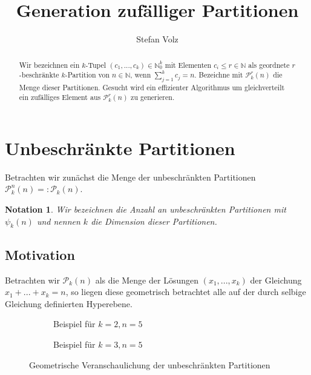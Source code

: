 \documentclass{article}
\title{Generation zufälliger Partitionen}
\author{Stefan Volz}
\newtheorem{notation}{Notation}
\begin{document}
\begin{titlepage}
    \maketitle

    \begin{abstract}
        Wir bezeichnen ein $k$-Tupel $(c_1,...,c_k) \in \mathbb{N}_0^k$ mit Elementen $c_i \leq r \in \mathbb{N}$ als geordnete $r$-beschränkte $k$-Partition von $n \in \mathbb{N}$, wenn $\sum_{j=1}^k c_j = n$. Bezeichne mit $\mathcal{P}_k^r(n)$ die Menge dieser Partitionen. Gesucht wird ein effizienter Algorithmus um gleichverteilt ein zufälliges Element aus $\mathcal{P}_k^r(n)$ zu generieren.
    \end{abstract}

    \tableofcontents
\end{titlepage}
\setcounter{page}{2}

\section{Unbeschränkte Partitionen}
Betrachten wir zunächst die Menge der unbeschränkten Partitionen $\mathcal{P}_k^n(n) =: \mathcal{P}_k(n)$.
\begin{notation}
    Wir bezeichnen die Anzahl an unbeschränkten Partitionen mit $\psi_k(n)$ und nennen $k$ die Dimension dieser Partitionen.
\end{notation}

\subsection{Motivation}

Betrachten wir $\mathcal{P}_k(n)$ als die Menge der Lösungen $(x_1, ... , x_k)$ der Gleichung $x_1 + ... + x_k = n$, so liegen diese geometrisch betrachtet alle auf der durch selbige Gleichung definierten Hyperebene.

\begin{figure}[ht]
    \centering
    \begin{subfigure}{.5\textwidth}
        \centering
        
        \caption{Beispiel für $k=2, n=5$}
        \label{fig:2d1}
    \end{subfigure}%
    \begin{subfigure}{.5\textwidth}
        \centering
        
        \caption{Beispiel für $k=3, n=5$}
        \label{fig:3d1}
    \end{subfigure}
    \caption{Geometrische Veranschaulichung der unbeschränkten Partitionen}
    \label{fig:unboundedpartitions}
\end{figure}
\end{document}
